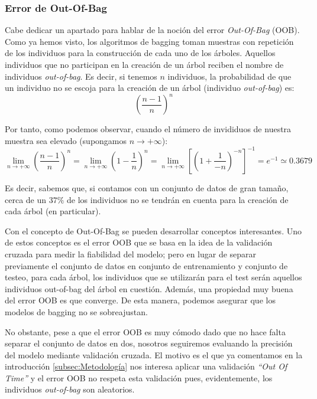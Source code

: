 \documentclass[12pt,twoside]{article}
\begin{document}
\subsubsection{Error de Out-Of-Bag}
Cabe dedicar un apartado para hablar de la noción del error \textit{Out-Of-Bag} (OOB). Como ya hemos visto, los algoritmos de bagging toman muestras con repetición de los individuos para la construcción de cada uno de los árboles. Aquellos individuos que no participan en la creación de un árbol reciben el nombre de individuos \textit{out-of-bag}. Es decir, si tenemos $n$ individuos, la probabilidad de que un individuo no se escoja para la creación de un árbol (individuo \textit{out-of-bag}) es:
\begin{equation*}
\left( \frac{n-1}{n} \right)^n
\end{equation*}

Por tanto, como podemos observar, cuando el número de invididuos de nuestra muestra sea elevado (supongamos $n \rightarrow +\infty$):
\begin{equation*}
\lim_{n \rightarrow + \infty} \left( \frac{n-1}{n} \right)^n = \lim_{n \rightarrow +\infty} \left( 1 - \frac{1}{n} \right)^n = \lim_{n \rightarrow +\infty} \left[ \left( 1 + \frac{1}{-n} \right)^{-n} \right] ^{-1} = e^{-1} \simeq 0.3679
\end{equation*}

Es decir, sabemos que, si contamos con un conjunto de datos de gran tamaño, cerca de un $37 \%$ de los individuos no se tendrán en cuenta para la creación de cada árbol (en particular).

Con el concepto de Out-Of-Bag se pueden desarrollar conceptos interesantes. Uno de estos conceptos es el error OOB que se basa en la idea de la validación cruzada para medir la fiabilidad del modelo; pero en lugar de separar previamente el conjunto de datos en conjunto de entrenamiento y conjunto de testeo, para cada árbol, los individuos que se utilizarán para el test serán aquellos individuos out-of-bag del árbol en cuestión. Además, una propiedad muy buena del error OOB es que converge. De esta manera, podemos asegurar que los modelos de bagging no se sobreajustan.

No obstante, pese a que el error OOB es muy cómodo dado que no hace falta separar el conjunto de datos en dos, nosotros seguiremos evaluando la precisión del modelo mediante validación cruzada. El motivo es el que ya comentamos en la introducción \ref{subsec:Metodología} nos interesa aplicar una validación \textit{``Out Of Time''} y el error OOB no respeta esta validación pues, evidentemente, los individuos \textit{out-of-bag} son aleatorios.
\end{document}

